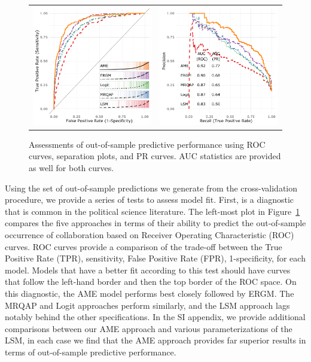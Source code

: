 \documentclass[9pt,twocolumn,twoside,lineno]{pnas-new}
\begin{document}
\begin{figure}[ht]
	\centering
	\begin{tabular}{cc}
	\includegraphics[width=.4\textwidth]{roc_outSample} &
	\includegraphics[width=.4\textwidth]{rocPr_outSample}
	\end{tabular}
	\caption{Assessments of out-of-sample predictive performance using ROC curves, separation plots, and PR curves. AUC statistics are provided as well for both curves.}
	\label{fig:roc}
\end{figure}
\FloatBarrier

Using the set of out-of-sample predictions we generate from the cross-validation procedure, we provide a series of tests to assess model fit. First, is a diagnostic that is common in the political science literature. The left-most plot in Figure~\ref{fig:roc} compares the five approaches in terms of their ability to predict the out-of-sample occurrence of collaboration based on Receiver Operating Characteristic (ROC) curves. ROC curves provide a comparison of the trade-off between the True Positive Rate (TPR), sensitivity, False Positive Rate (FPR), 1-specificity, for each model. Models that have a better fit according to this test should have curves that follow the left-hand border and then the top border of the ROC space. On this diagnostic, the AME model performs best closely followed by ERGM. The MRQAP and Logit approaches perform similarly, and the LSM approach lags notably behind the other specifications. In the SI appendix, we provide additional comparisons between our AME approach and various parameterizations of the LSM, in each case we find that the AME approach provides far superior results in terms of out-of-sample predictive performance.
\end{document}
